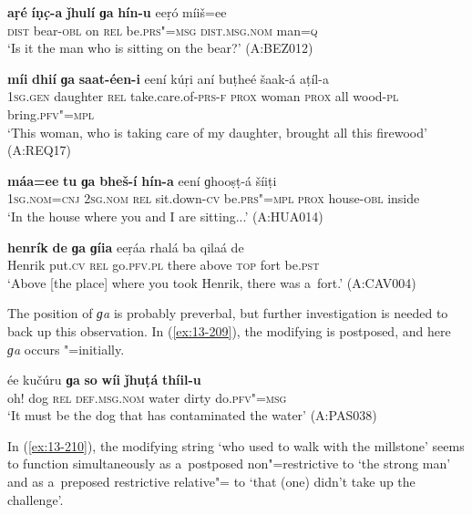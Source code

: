 \ea
\label{ex:13-205}
\gll \textbf{aṛé} \textbf{íṇc̣-a} \textbf{ǰhulí} \textbf{ɡa} \textbf{hín-u} eeṛó  míiš=ee \\
\textsc{dist} bear-\textsc{obl} on \textsc{rel} be.\textsc{prs"=msg} \textsc{dist.msg.nom}   man=\textsc{q} \\
\glt `Is it the man who is sitting on the bear?' (A:BEZ012)

\ex
\label{ex:13-206}
\gll \textbf{míi} \textbf{dhií} \textbf{ɡa} \textbf{saat-éen-i} eení kúṛi  aní buṭheé šaak-á aṭíl-a \\
\textsc{1sg.gen} daughter \textsc{rel} take.care.of-\textsc{prs-f} \textsc{prox} woman \textsc{prox} all wood-\textsc{pl} bring.\textsc{pfv"=mpl} \\
\glt `This woman, who is taking care of my daughter, brought all this firewood' (A:REQ17)

\ex
\label{ex:13-207}
\gll \textbf{máa=ee} \textbf{tu} \textbf{ɡa} \textbf{bheš-í} \textbf{hín-a}  eení ɡhooṣṭ-á šíiṭi\\
\textsc{1sg.nom=cnj} \textsc{2sg.nom} \textsc{rel} sit.down-\textsc{cv} be.\textsc{prs"=mpl} \textsc{prox} house-\textsc{obl} inside\\
\glt `In the house where you and I are sitting...' (A:HUA014)

\ex
\label{ex:13-208}
\gll \label{bkm:Ref190845659}\textbf{henrík} \textbf{de} \textbf{ɡa} \textbf{ɡíia} eeṛáa rhalá ba  qilaá de \\
Henrik put.\textsc{cv} \textsc{rel} go.\textsc{pfv.pl}  there above \textsc{top} fort be.\textsc{pst } \\
\glt `Above [the place] where you took Henrik, there was a~fort.' (A:CAV004) 
\z

The position of \textit{ɡa} is probably preverbal, but further investigation is needed to back up this observation. In (\ref{ex:13-209}), the modifying  is postposed, and here \textit{ɡa} occurs "=initially.

\begin{exe}
\ex
\label{ex:13-209}
\gll ée kučúru \textbf{ɡa} \textbf{so} \textbf{wíi} \textbf{ǰhuṭá} \textbf{thíil-u}  \\
oh! dog \textsc{rel} \textsc{def.msg.nom} water dirty do.\textsc{pfv"=msg} \\
\glt `It must be the dog that has contaminated the water' (A:PAS038) 
\end{exe}

In (\ref{ex:13-210}), the modifying string `who used to walk with the millstone' seems to function simultaneously as a~postposed non"=restrictive  to `the \iliDameli strong man' and as a~preposed restrictive relative"= to `that (one) didn't take up the challenge'.

